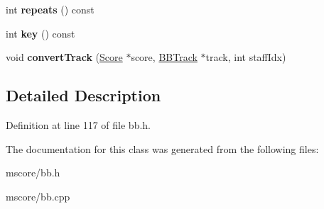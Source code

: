 \begin{DoxyCompactItemize}
\mbox{\label{class_ms_1_1_b_b_file_a242912cca5a092599fd327d9715b5a95}} 
int {\bfseries repeats} () const
\item 
\mbox{\label{class_ms_1_1_b_b_file_a859c9d4b94c909142476a496df8c5f9b}} 
int {\bfseries key} () const
\item 
\mbox{\label{class_ms_1_1_b_b_file_a76e6f77a7b2d762f56f819e2b23ef6b8}} 
void {\bfseries convert\+Track} (\hyperlink{class_ms_1_1_score}{Score} $\ast$score, \hyperlink{class_ms_1_1_b_b_track}{B\+B\+Track} $\ast$track, int staff\+Idx)
\end{DoxyCompactItemize}


\subsection{Detailed Description}


Definition at line 117 of file bb.\+h.



The documentation for this class was generated from the following files\+:\begin{DoxyCompactItemize}
\item 
mscore/bb.\+h\item 
mscore/bb.\+cpp\end{DoxyCompactItemize}
